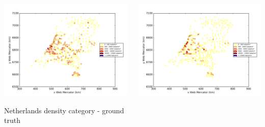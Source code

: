 \documentclass[c]{beamer}
\begin{document}
\begin{frame}
\begin{columns}
 \begin{column}{0.5\textwidth}
  \begin{overlayarea}{\linewidth}{4cm}
    \centering\vfill
    \includegraphics[scale=0.25]{../../data/Pays-Bas/test/Support_Vector_Gaussian_Classification/Support_Vector_Gaussian_Classification/density_ground_truth.png}
  \end{overlayarea}
  \begin{overlayarea}{\linewidth}{0.5cm}
    \centering
    \tiny Netherlands density category - ground truth\par
  \end{overlayarea}
 \end{column}
 \begin{column}{0.5\textwidth}
  \begin{overlayarea}{\linewidth}{4cm}
    \centering\vfill
    \includegraphics[scale=0.25]{../../data/Pays-Bas/test/Support_Vector_Gaussian_Classification/Support_Vector_Gaussian_Classification/density_classification.png}

\end{overlayarea}
\end{column}
\end{columns}
\end{frame}
\end{document}
